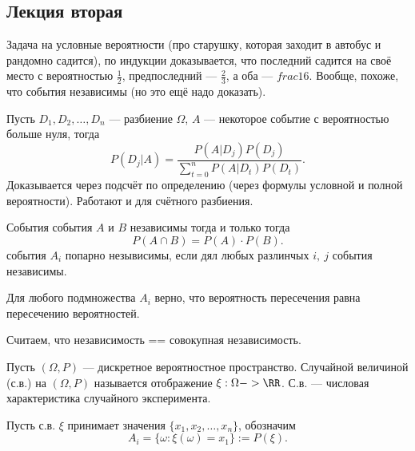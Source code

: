 \subsection{Лекция вторая}

\begin{problem}
    Задача на условные вероятности (про старушку, которая заходит в автобус и рандомно садится), по индукции доказывается, что последний
    садится на своё место с вероятностью $\frac{1}{2}$, предпоследний --- $\frac{2}{3}$, а оба --- $frac{1}{6}$. Вообще, похоже, что события независимы
    (но это ещё надо доказать). 
\end{problem}

\begin{claim}
    Пусть $D_1, D_2, \ldots, D_n$ --- разбиение $\Omega$, $A$ --- некоторое событие с вероятностью больше нуля, тогда
    \[P(D_j | A) = \frac{P(A | D_j)P(D_j)}{\sum_{t=0}^n P(A | D_t)P(D_t)}.\]
    Доказывается через подсчёт по определению (через формулы условной и полной вероятности). Работают и для счётного разбиения. 
\end{claim}

\begin{definition}[Независимость]
    События события $A$ и $B$ независимы тогда и только тогда 
    \[P(A \cap B) = P(A) \cdot P(B).\]
    события $A_i$ попарно незывисимы, если дял любых разлинчых $i,\ j$ события независимы.
\end{definition}

\begin{definition}
    Для любого подмножества $A_i$ верно, что вероятность пересечения равна пересечению вероятностей.
\end{definition}

\begin{remark}
    Считаем, что независимость == совокупная независимость. 
\end{remark}

\begin{definition}
    Пусть $(\Omega, P)$ --- дискретное вероятностное пространство. Случайной величиной (с.в.) на $(\Omega, P)$ называется отображение $\xi: \Omega -> \RR$.
    С.в. --- числовая характеристика случайного эксперимента.
\end{definition}

\begin{definition}
    Пусть с.в. $\xi$ принимает значения $\{x_1, x_2, \ldots, x_n\}$, обозначим 
    \[A_i = \{\omega : \xi(\omega) = x_1\} := P(\xi).\]
\end{definition}
